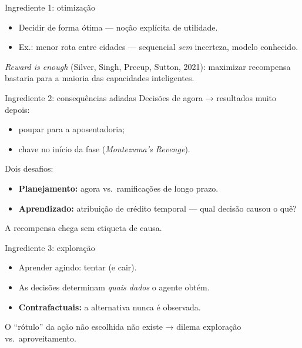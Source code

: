 \documentclass[aspectratio=169, 11pt]{beamer}
\begin{document}
\begin{frame}{Ingrediente 1: otimização}
  \begin{itemize}
    \item Decidir de forma \alert{ótima} — noção explícita de utilidade.
    \item Ex.: menor rota entre cidades — sequencial \emph{sem} incerteza, modelo conhecido.
  \end{itemize}

  \begin{ideiabox}
    \emph{Reward is enough} (Silver, Singh, Precup, Sutton, 2021): maximizar recompensa bastaria para a maioria das capacidades inteligentes.
  \end{ideiabox}
\end{frame}

\begin{frame}{Ingrediente 2: consequências adiadas}
  Decisões de agora → resultados muito depois:
  \begin{itemize}
    \item poupar para a aposentadoria;
    \item chave no início da fase (\emph{Montezuma's Revenge}).
  \end{itemize}

  \medskip
  Dois desafios:
  \begin{itemize}
    \item \textbf{Planejamento:} agora vs.\ ramificações de longo prazo.
    \item \textbf{Aprendizado:} \alert{atribuição de crédito temporal} — qual decisão causou o quê?
  \end{itemize}

  \begin{alertabox}
    A recompensa chega sem etiqueta de causa.
  \end{alertabox}
\end{frame}

\begin{frame}{Ingrediente 3: exploração}
  \begin{itemize}
    \item Aprender agindo: tentar (e cair).
    \item As decisões determinam \emph{quais dados} o agente obtém.
    \item \textbf{Contrafactuais:} a alternativa nunca é observada.
  \end{itemize}

  \begin{ideiabox}
    O ``rótulo'' da ação não escolhida não existe → dilema \alert{exploração vs.\ aproveitamento}.
  \end{ideiabox}
\end{frame}
\end{document}
